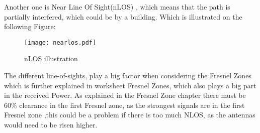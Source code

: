 Another one is Near Line Of Sight(nLOS) \citep{los}, which means that the path is partially interfered,  which could be by a building. Which is illustrated on the following Figure:

\begin{figure}[H]
\centering
\texttt{[image: nearlos.pdf]}
\caption{nLOS illustration}
\label{nLOS}
\end{figure} 


The different line-of-sights, play a big factor when considering the Fresnel Zones which is further explained in worksheet Fresnel Zones, which also plays a big part in the received Power. As explained in the Fresnel Zone chapter there must be $60\%$ clearance in the first Fresnel zone, as the strongest signals are in the first Fresnel zone ,this could be a problem if there is too much NLOS, as the antennas would need to be risen higher.       

















